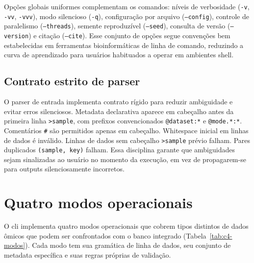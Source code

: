 Opções globais uniformes complementam os comandos: níveis de verbosidade (\texttt{-v}, \texttt{-vv}, \texttt{-vvv}), modo silencioso (\texttt{-q}), configuração por arquivo (\texttt{--config}), controle de paralelismo (\texttt{--threads}), semente reproduzível (\texttt{--seed}), consulta de versão (\texttt{--version}) e citação (\texttt{--cite}). Esse conjunto de opções segue convenções bem estabelecidas em ferramentas bioinformáticas de linha de comando, reduzindo a curva de aprendizado para usuários habituados a operar em ambientes shell.

\subsection{Contrato estrito de parser}

O parser de entrada implementa contrato rígido para reduzir ambiguidade e evitar erros silenciosos. Metadata declarativa aparece em cabeçalho antes da primeira linha \texttt{>sample}, com prefixos convencionados \texttt{@dataset:*} e \texttt{@mode.*:*}. Comentários \texttt{\#} são permitidos apenas em cabeçalho. Whitespace inicial em linhas de dados é inválido. Linhas de dados sem cabeçalho \texttt{>sample} prévio falham. Pares duplicados \texttt{(sample, key)} falham. Essa disciplina garante que ambiguidades sejam sinalizadas ao usuário no momento da execução, em vez de propagarem-se para outputs silenciosamente incorretos.

\section{Quatro modos operacionais}
\label{sec:c4-modos}

O \gls{cli} implementa quatro modos operacionais que cobrem tipos distintos de dados ômicos que podem ser confrontados com o banco integrado (Tabela~\ref{tab:c4-modos}). Cada modo tem sua gramática de linha de dados, seu conjunto de metadata específica e suas regras próprias de validação.


